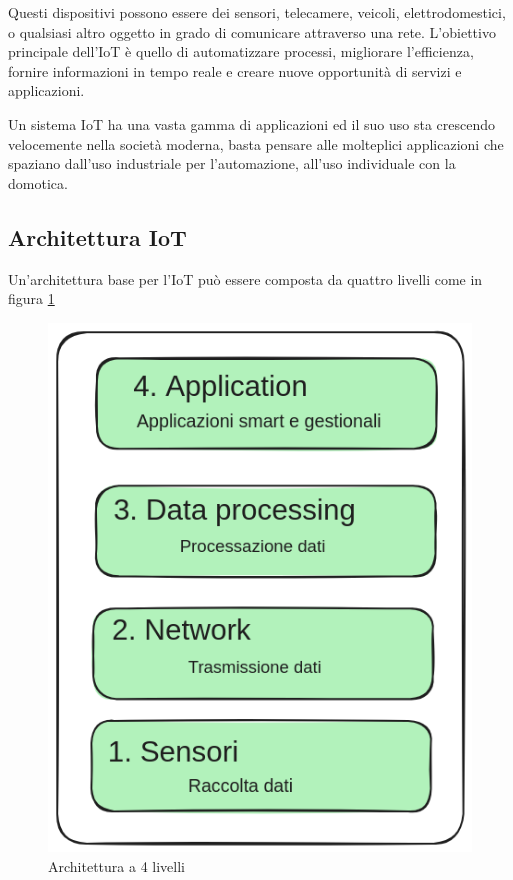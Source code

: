 Questi dispositivi possono essere 
dei sensori, telecamere, veicoli, elettrodomestici,
o qualsiasi altro oggetto in grado di comunicare
attraverso una rete.
L'obiettivo principale dell'IoT è quello di automatizzare processi,
migliorare l'efficienza, fornire informazioni in tempo reale
e creare nuove opportunità di servizi e applicazioni.

Un sistema IoT ha una vasta gamma di applicazioni ed il suo uso 
sta crescendo velocemente nella società moderna, basta pensare alle
molteplici applicazioni che spaziano dall'uso industriale
per l'automazione, all'uso individuale con la domotica.

\subsection{Architettura IoT}

Un'architettura base per l'IoT può essere composta da quattro
livelli come in figura \ref{fig:architettura_iot}

\begin{figure}[!htp]
    \centering
    \includegraphics[keepaspectratio=true,scale=0.3]{images/architettura_iot.png}
	\caption{Architettura a 4 livelli}
  	\label{fig:architettura_iot}
\end{figure}

